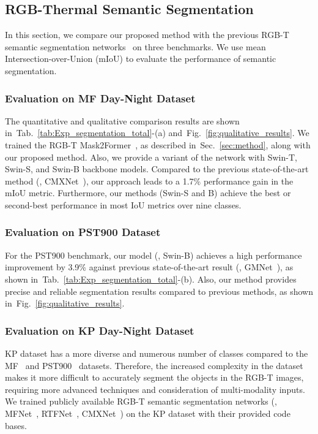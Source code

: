 \documentclass[10pt,twocolumn,letterpaper]{article}
\newcommand{\figref}[1]{Fig.~\ref{#1}}
\newcommand{\tabref}[1]{Tab.~\ref{#1}}
\newcommand{\secref}[1]{Sec.~\ref{#1}}
\begin{document}
\subsection{RGB-Thermal Semantic Segmentation}
\label{subsec:rgb_thermal_semantic_segmentation}
In this section, we compare our proposed method with the previous RGB-T semantic segmentation networks~\cite{ha2017mfnet,sun2019rtfnet,shivakumar2019pst900,sun2020fuseseg,zhou2021gmnet,xu2021attention,zhang2021abmdrnet,deng2021feanet,liu2022cmx} on three benchmarks.
We use mean Intersection-over-Union (mIoU) to evaluate the performance of semantic segmentation.

\subsubsection{Evaluation on MF Day-Night Dataset~\cite{ha2017mfnet}}
\label{subsec:eval_mf_day_night}
The quantitative and qualitative comparison results are shown in~\tabref{tab:Exp_segmentation_total}-(a) and~\figref{fig:qualitative_results}.
We trained the RGB-T Mask2Former~\cite{cheng2022masked}, as described in~\secref{sec:method}, along with our proposed method.
Also, we provide a variant of the network with Swin-T, Swin-S, and Swin-B backbone models.
Compared to the previous state-of-the-art method (\ie, CMXNet~\cite{liu2022cmx}), our approach leads to a 1.7\% performance gain in the mIoU metric.
Furthermore, our methods (Swin-S and B) achieve the best or second-best performance in most IoU metrics over nine classes.  

\subsubsection{Evaluation on PST900 Dataset~\cite{shivakumar2019pst900}}
\label{subsec:eval_mf_day_night}
For the PST900 benchmark, our model (\ie, Swin-B) achieves a high performance improvement by 3.9\% against previous state-of-the-art result (\ie, GMNet~\cite{zhou2021gmnet}), as shown in~\tabref{tab:Exp_segmentation_total}-(b).
Also, our method provides precise and reliable segmentation results compared to previous methods, as shown in~\figref{fig:qualitative_results}. 

\subsubsection{Evaluation on KP Day-Night Dataset~\cite{hwang2015multispectral,kim2021ms}}
\label{subsubsec:eval_kp_dataset}
KP dataset has a more diverse and numerous number of classes compared to the MF~\cite{ha2017mfnet} and PST900~\cite{shivakumar2019pst900} datasets.
Therefore, the increased complexity in the dataset makes it more difficult to accurately segment the objects in the RGB-T images, requiring more advanced techniques and consideration of multi-modality inputs. 
We trained publicly available RGB-T semantic segmentation networks (\ie, MFNet~\cite{ha2017mfnet}, RTFNet~\cite{sun2019rtfnet}, CMXNet~\cite{liu2022cmx}) on the KP dataset with their provided code bases.
\end{document}
